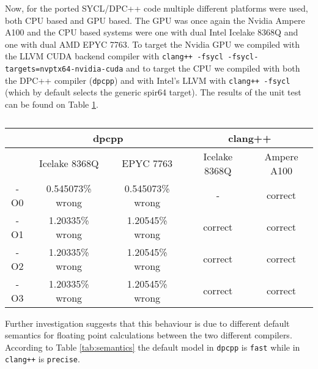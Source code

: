 Now, for the ported SYCL/DPC++ code multiple different platforms were used, both CPU based and GPU based.
The GPU was once again the Nvidia Ampere A100 and the CPU based systems were one with dual Intel Icelake 8368Q and one with dual AMD EPYC 7763.
To target the Nvidia GPU we compiled with the LLVM CUDA backend compiler with \texttt{clang++ -fsycl -fsycl-targets=nvptx64-nvidia-cuda} and to target the CPU we compiled with both the DPC++ compiler (\texttt{dpcpp}) and with Intel's LLVM with \texttt{clang++ -fsycl} (which by default selects the generic spir64 target).
The results of the unit test can be found on Table \ref{tab:correctness}.

\begin{center}
	\begin{table}
		\begin{tabular}{||c c c c c||}
			\hline
			    & \multicolumn{2}{c}{dpcpp} & \multicolumn{2}{c||}{clang++}                               \\ [0.5ex]
			\hline
			    & Icelake 8368Q             & EPYC 7763                     & Icelake 8368Q & Ampere A100 \\ [0.5ex]
			\hline\hline
			-O0 & 0.545073\% wrong          & 0.545073\% wrong              & -             & correct     \\ [0.3ex]
			\hline
			-O1 & 1.20335\% wrong           & 1.20545\% wrong               & correct       & correct     \\ [0.3ex]
			\hline
			-O2 & 1.20335\% wrong           & 1.20545\% wrong               & correct       & correct     \\ [0.3ex]
			\hline
			-O3 & 1.20335\% wrong           & 1.20545\% wrong               & correct       & correct     \\ [0.3ex]
			\hline
		\end{tabular}
		\caption{\label{tab:correctness}}
	\end{table}
\end{center}

Further investigation suggests that this behaviour is due to different default semantics for floating point calculations between the two different compilers.
According to Table \ref{tab:semantics} the default model in \texttt{dpcpp} is \texttt{fast} while in \texttt{clang++} is \texttt{precise}.

